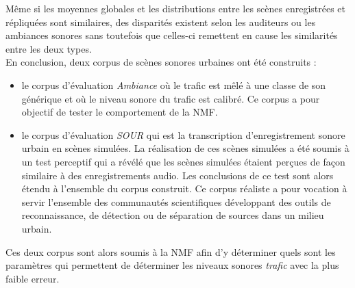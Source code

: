 Même si les moyennes globales et les distributions entre les scènes enregistrées et répliquées sont similaires, des disparités existent selon les auditeurs ou les ambiances sonores sans toutefois que celles-ci remettent en cause les similarités entre les deux types.\\

En conclusion, deux corpus de scènes sonores urbaines ont été construits :
\begin{itemize}
\item le corpus d'évaluation \textit{Ambiance} où le trafic est mêlé à une classe de son générique et où le niveau sonore du trafic est calibré.  Ce corpus a pour objectif de tester le comportement de la NMF.
\item le corpus d'évaluation \textit{SOUR} qui est la transcription d'enregistrement sonore urbain en scènes simulées. La réalisation de ces scènes simulées a été soumis à un test perceptif qui a révélé que les scènes simulées étaient perçues de façon similaire à des enregistrements audio. Les conclusions de ce test sont alors étendu à l'ensemble du corpus construit. Ce corpus réaliste a pour vocation à servir l'ensemble des communautés scientifiques développant des outils de reconnaissance, de détection ou de séparation de sources dans un milieu urbain. \\
\end{itemize}

Ces deux corpus sont alors soumis à la NMF afin d'y déterminer quels sont les paramètres qui permettent de déterminer les niveaux sonores \textit{trafic} avec la plus faible erreur.


%

